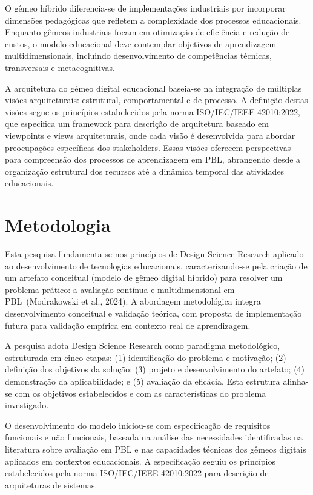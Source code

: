 \documentclass[english, spanish, brazilian]{modelo_dt}
\begin{document}
O gêmeo híbrido diferencia-se de implementações industriais por incorporar
dimensões pedagógicas que refletem a complexidade dos processos educacionais\@.
Enquanto gêmeos industriais focam em otimização de eficiência e redução de
custos, o modelo educacional deve contemplar objetivos de aprendizagem
multidimensionais, incluindo desenvolvimento de competências técnicas,
transversais e metacognitivas\@.

A arquitetura do gêmeo digital educacional baseia-se na integração de múltiplas
visões arquiteturais: estrutural, comportamental e de processo\@. A definição
destas visões segue os princípios estabelecidos pela norma ISO/IEC/IEEE
42010:2022, que especifica um framework para descrição de arquitetura baseado
em viewpoints e views arquiteturais, onde cada visão é desenvolvida para abordar preocupações específicas dos stakeholders\@. Essas visões oferecem perspectivas
para compreensão dos processos de aprendizagem em PBL, abrangendo desde a
organização estrutural dos recursos até a dinâmica temporal das atividades
educacionais\@.

\section{Metodologia}

Esta pesquisa fundamenta-se nos princípios de Design Science Research aplicado
ao desenvolvimento de tecnologias educacionais, caracterizando-se pela criação
de um artefato conceitual (modelo de gêmeo digital híbrido) para resolver um
problema prático: a avaliação contínua e multidimensional em PBL~(Modrakowski
et al., 2024). A abordagem metodológica integra desenvolvimento conceitual e
validação teórica, com proposta de implementação futura para validação empírica
em contexto real de aprendizagem.

A pesquisa adota Design Science Research como paradigma metodológico,
estruturada em cinco etapas: (1) identificação do problema e motivação; (2)
definição dos objetivos da solução; (3) projeto e desenvolvimento do artefato;
(4) demonstração da aplicabilidade; e (5) avaliação da eficácia. Esta estrutura
alinha-se com os objetivos estabelecidos e com as características do problema
investigado.

O desenvolvimento do modelo iniciou-se com especificação de requisitos
funcionais e não funcionais, baseada na análise das necessidades identificadas
na literatura sobre avaliação em PBL e nas capacidades técnicas dos gêmeos
digitais aplicados em contextos educacionais. A especificação seguiu os
princípios estabelecidos pela norma ISO/IEC/IEEE 42010:2022 para descrição de
arquiteturas de sistemas.
\end{document}
